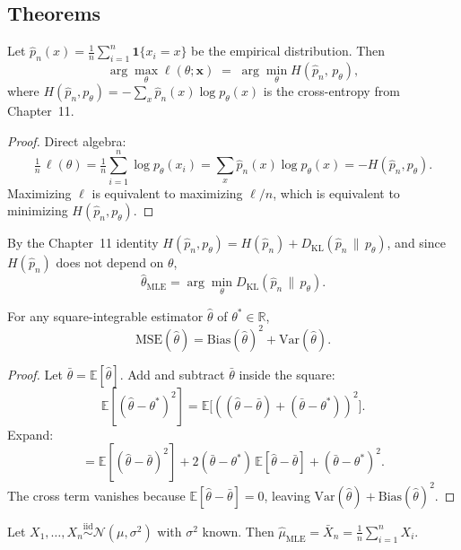 \subsection*{Theorems}

\begin{theorem}\label{thm:mle-ce}
Let $\hat p_n(x) = \tfrac{1}{n}\sum_{i=1}^n \mathbf{1}\{x_i = x\}$ be the empirical distribution. Then
\[
\arg\max_\theta \ell(\theta;\mathbf{x}) \;=\; \arg\min_\theta H(\hat p_n,\,p_\theta),
\]
where $H(\hat p_n, p_\theta) = -\sum_x \hat p_n(x)\log p_\theta(x)$ is the cross-entropy from Chapter~11.
\end{theorem}

\begin{proof}
Direct algebra:
\[
\tfrac{1}{n}\,\ell(\theta) = \tfrac{1}{n}\sum_{i=1}^n \log p_\theta(x_i) = \sum_x \hat p_n(x)\log p_\theta(x) = -H(\hat p_n, p_\theta).
\]
Maximizing $\ell$ is equivalent to maximizing $\ell/n$, which is equivalent to minimizing $H(\hat p_n,p_\theta)$.
\end{proof}

\begin{corollary}
By the Chapter~11 identity $H(\hat p_n,p_\theta) = H(\hat p_n) + D_{\mathrm{KL}}(\hat p_n \,\|\, p_\theta)$, and since $H(\hat p_n)$ does not depend on $\theta$,
\[
\hat\theta_{\mathrm{MLE}} = \arg\min_\theta D_{\mathrm{KL}}(\hat p_n \,\|\, p_\theta).
\]
\end{corollary}

\begin{theorem}\label{thm:bv}
For any square-integrable estimator $\hat\theta$ of $\theta^* \in \mathbb{R}$,
\[
\mathrm{MSE}(\hat\theta) = \mathrm{Bias}(\hat\theta)^2 + \mathrm{Var}(\hat\theta).
\]
\end{theorem}

\begin{proof}
Let $\bar\theta = \mathbb{E}[\hat\theta]$. Add and subtract $\bar\theta$ inside the square:
\[
\mathbb{E}[(\hat\theta-\theta^*)^2] = \mathbb{E}\bigl[((\hat\theta-\bar\theta)+(\bar\theta-\theta^*))^2\bigr].
\]
Expand:
\[
= \mathbb{E}[(\hat\theta-\bar\theta)^2] + 2(\bar\theta-\theta^*)\,\mathbb{E}[\hat\theta-\bar\theta] + (\bar\theta-\theta^*)^2.
\]
The cross term vanishes because $\mathbb{E}[\hat\theta-\bar\theta]=0$, leaving $\mathrm{Var}(\hat\theta) + \mathrm{Bias}(\hat\theta)^2$.
\end{proof}

\begin{theorem}\label{thm:mle-gauss}
Let $X_1,\dots,X_n \stackrel{\mathrm{iid}}{\sim} \mathcal{N}(\mu,\sigma^2)$ with $\sigma^2$ known. Then $\hat\mu_{\mathrm{MLE}} = \bar X_n = \tfrac{1}{n}\sum_{i=1}^n X_i$.
\end{theorem}

